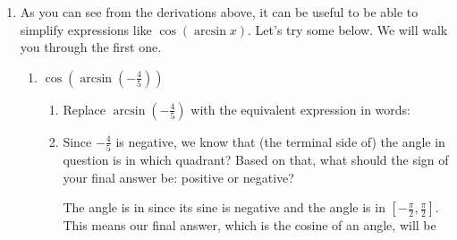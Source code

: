 \documentclass[main]{subfiles}
\begin{document}
\begin{enumerate}[resume]
\begin{enumerate}
    \begin{solution}
      \begin{align*}
        h'(x) = {} & \frac{d}{dx}
        \left(\fcolorbox{red}{white}{$\displaystyle
            \fcolorbox{blue}{white}{$\displaystyle  \arctan\left(4
                x\right)$}^ { \frac{1}{2}} $}\right) \\ 
        = {} & \frac{1}{2} \cdot \arctan\left(4
          x\right)^ { -1/2} \cdot \frac{d}{dx}
        \left(\fcolorbox{red}{white}{$\displaystyle
            \arctan\left(\fcolorbox{blue}{white}{$\displaystyle 4
                x$}\right)$}\right) \\ 
        = {} & \boxed{\frac{1}{2}\cdot \arctan\left(4
          x\right)^ { -1/2} \cdot \left(\frac{1}{1 + (4x)^2}\cdot
          4\right)} 
      \end{align*}
    \end{solution}
  \end{enumerate}

\probonly{\newpage}


  \item 
 As you can see from the derivations above, it can be useful to be able to simplify expressions like $\cos(\arcsin x)$. Let's try
  some below. We will walk you through the first one.

  \begin{enumerate}[topsep=0pt]

    \item
      $\cos(\arcsin (-\frac{4}{5}))$
        \begin{enumerate}[topsep=0pt]
          \item Replace $\arcsin ({-\frac{4}{5}})$ with the equivalent
            expression in words:
            

            \item
              \begin{problem}[\stretch{0.25}]
                Since $-\frac{4}{5}$ is negative, we know that
                (the terminal side of) the angle in question is in
                which quadrant? Based on that, what should the sign of your final answer be: positive or negative?
              \end{problem}

              
                The angle is in  since its sine is negative and
                the angle is in $[-\frac{\pi}{2},\frac{\pi}{2}]$.
                This means our final answer, which is the cosine of an angle,
                will be 
              


\end{enumerate}
\end{enumerate}
\end{enumerate}
\end{document}
